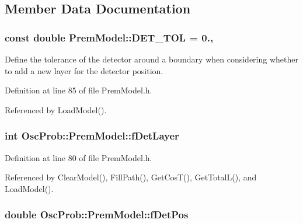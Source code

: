 \subsection{Member Data Documentation}
\subsubsection[{\texorpdfstring{D\+E\+T\+\_\+\+T\+OL}{DET_TOL}}]{\setlength{\rightskip}{0pt plus 5cm}const double Prem\+Model\+::\+D\+E\+T\+\_\+\+T\+OL = 0.\hspace{0.3cm}{\ttfamily [static]}, {\ttfamily [protected]}}\hypertarget{classOscProb_1_1PremModel_a8ad1335ebe80ee1cd1cdf59d774ab34b}{}\label{classOscProb_1_1PremModel_a8ad1335ebe80ee1cd1cdf59d774ab34b}
Define the tolerance of the detector around a boundary when considering whether to add a new layer for the detector position. 

Definition at line 85 of file Prem\+Model.\+h.



Referenced by Load\+Model().

\subsubsection[{\texorpdfstring{f\+Det\+Layer}{fDetLayer}}]{\setlength{\rightskip}{0pt plus 5cm}int Osc\+Prob\+::\+Prem\+Model\+::f\+Det\+Layer\hspace{0.3cm}{\ttfamily [protected]}}\hypertarget{classOscProb_1_1PremModel_a4fb68506493666349f418b893a996185}{}\label{classOscProb_1_1PremModel_a4fb68506493666349f418b893a996185}


Definition at line 80 of file Prem\+Model.\+h.



Referenced by Clear\+Model(), Fill\+Path(), Get\+Cos\+T(), Get\+Total\+L(), and Load\+Model().

\subsubsection[{\texorpdfstring{f\+Det\+Pos}{fDetPos}}]{\setlength{\rightskip}{0pt plus 5cm}double Osc\+Prob\+::\+Prem\+Model\+::f\+Det\+Pos\hspace{0.3cm}{\ttfamily [protected]}}\hypertarget{classOscProb_1_1PremModel_ab12ea0343cd11b9233ffd20ab5e620c7}{}\label{classOscProb_1_1PremModel_ab12ea0343cd11b9233ffd20ab5e620c7}


